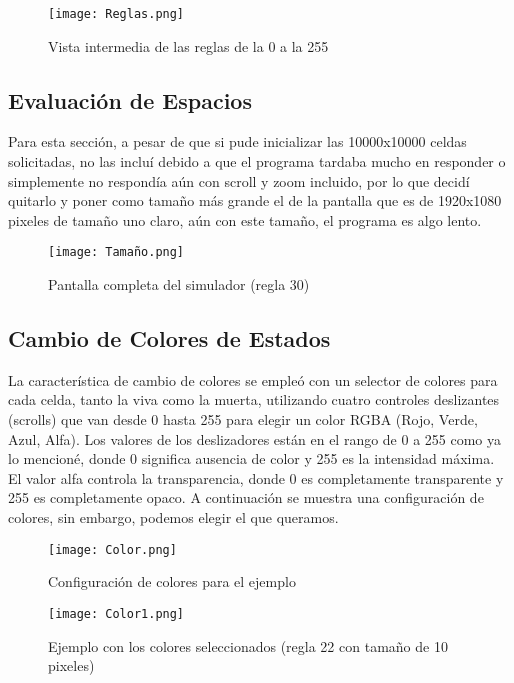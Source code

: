 \documentclass{article}
\begin{document}
	
		\begin{figure}[h]
		\centering       
		\texttt{[image: Reglas.png]}
		\caption{Vista intermedia de las reglas de la 0 a la 255}
		\label{fig:mi_imagen} 
	\end{figure}
	
\vspace{300pt}	
\subsection{Evaluación de Espacios}

Para esta sección, a pesar de que si pude inicializar las 10000x10000 celdas solicitadas, no las incluí debido a que el programa tardaba mucho en responder o simplemente no respondía aún con scroll y zoom incluido, por lo que decidí quitarlo y poner como tamaño más grande el de la pantalla que es de 1920x1080 pixeles de tamaño uno claro, aún con este tamaño, el programa es algo lento. 

\begin{figure}[h]
	\centering       
	\texttt{[image: Tamaño.png]}
	\caption{Pantalla completa del simulador (regla 30)}
	\label{fig:mi_imagen1}
\end{figure}

\subsection{Cambio de Colores de Estados}

La característica de cambio de colores se empleó con un selector de colores para cada celda, tanto la viva como la muerta, utilizando cuatro controles deslizantes (scrolls) que van desde 0 hasta 255 para elegir un color RGBA (Rojo, Verde, Azul, Alfa). 
Los valores de los deslizadores están en el rango de 0 a 255 como ya lo mencioné, donde 0 significa ausencia de color y 255 es la intensidad máxima. El valor alfa controla la transparencia, donde 0 es completamente transparente y 255 es completamente opaco. A continuación se muestra una configuración de colores, sin embargo, podemos elegir el que queramos. 

\begin{figure}[h]
	\begin{minipage}{0.6\textwidth}
		\centering
		\texttt{[image: Color.png]}
		\caption{Configuración de colores para el ejemplo}
		\label{fig:mi_imagen2}
	\end{minipage}%
	\begin{minipage}{0.45\textwidth}
		\centering
		\texttt{[image: Color1.png]}
		\caption{Ejemplo con los colores seleccionados (regla 22 con tamaño de 10 pixeles)}
		\label{fig:mi_imagen3}
	\end{minipage}
\end{figure}
	
\end{document}
